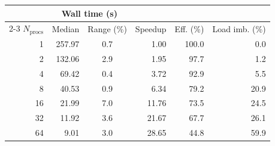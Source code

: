 \begin{tabular}{@{}r@{\quad}r@{\enspace}c@{\quad}r@{\quad}r@{\quad}r@{}}
  \hline
   & \multicolumn{2}{c}{Wall time (s)} &  &  &  \\
  \cline{2-3}
  $N_{\mathrm{procs}}$ & Median & Range (\%) & Speedup & Eff. (\%) & Load imb. (\%) \\
  \hline
  1 & 257.97 & 0.7 & 1.00 & 100.0 & 0.0 \\
  2 & 132.06 & 2.9 & 1.95 & 97.7 & 1.2 \\
  4 & 69.42 & 0.4 & 3.72 & 92.9 & 5.5 \\
  8 & 40.53 & 0.9 & 6.34 & 79.2 & 20.9 \\
  16 & 21.99 & 7.0 & 11.76 & 73.5 & 24.5 \\
  32 & 11.92 & 3.6 & 21.67 & 67.7 & 26.1 \\
  64 & 9.01 & 3.0 & 28.65 & 44.8 & 59.9 \\
  \hline
\end{tabular}
